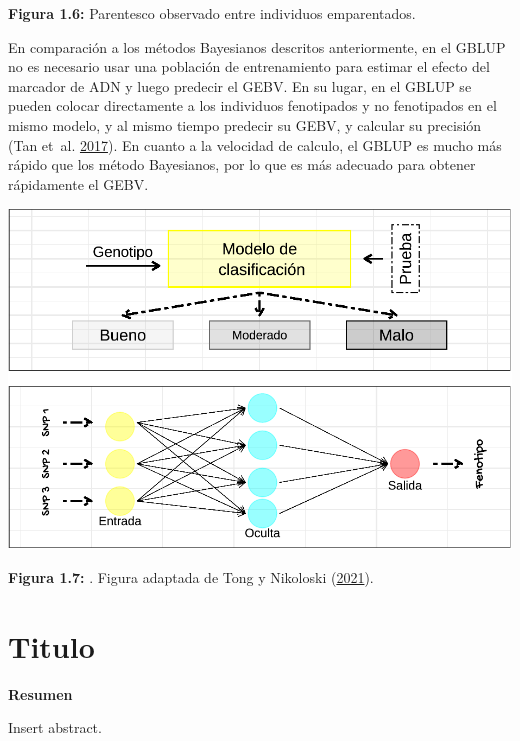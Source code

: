 \documentclass[11pt,spanish,a4paper,oneside,]{book} %
\begin{document}
\begin{center}
\textbf{Figura 1.6:} Parentesco observado entre individuos emparentados.

\end{center}

En comparación a los métodos Bayesianos descritos anteriormente, en el GBLUP no es necesario usar una población de entrenamiento para estimar el efecto del marcador de ADN y luego predecir el GEBV. En su lugar, en el GBLUP se pueden colocar directamente a los individuos fenotipados y no fenotipados en el mismo modelo, y al mismo tiempo predecir su GEBV, y calcular su precisión (Tan et~al. \protect\hyperlink{ref-cite:34}{2017}). En cuanto a la velocidad de calculo, el GBLUP es mucho más rápido que los método Bayesianos, por lo que es más adecuado para obtener rápidamente el GEBV.

\begin{center}\includegraphics[width=1\linewidth]{figures/Mod_ML} \end{center}

\begin{center}
\textbf{Figura 1.7:} . Figura adaptada de Tong y Nikoloski (\protect\hyperlink{ref-cite:7}{2021}).

\end{center}

\hypertarget{titulo}{%
\chapter{Titulo}\label{titulo}}

\textbf{Resumen}

\noindent 
Insert abstract.
\end{document}
